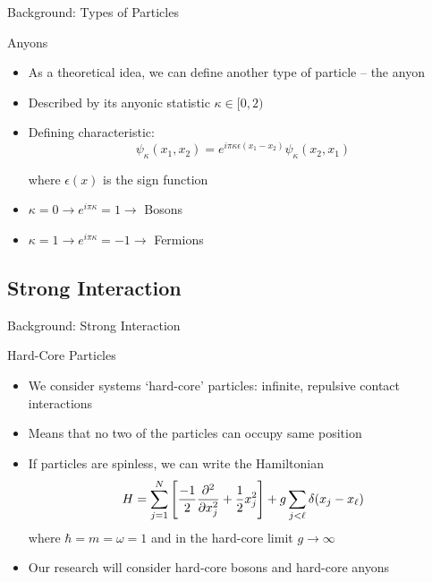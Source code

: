 \documentclass[12pt, usenames, dvipsnames]{beamer}
\begin{document}
\begin{frame}[t]{Background: Types of Particles}


\begin{block}{Anyons}

\begin{itemize}
\item As a theoretical idea, we can define another type of particle -- the anyon
\item Described by its anyonic statistic $\kappa \in [0,2)$ 
\item Defining characteristic:
\[ \psi_{\kappa}(x_{1}, x_{2}) = e^{i \pi \kappa \epsilon(x_1 - x_2)} \psi_{\kappa}(x_{2}, x_{1})  \]

where $\epsilon(x)$ is the sign function

\item $\kappa  = 0 \rightarrow e^{i \pi \kappa} = 1 \rightarrow$ Bosons
\item $\kappa  = 1 \rightarrow e^{i \pi \kappa} = -1 \rightarrow$ Fermions
\end{itemize}
\end{block}


\end{frame}

\subsection{Strong Interaction}


\begin{frame}[t]{Background: Strong Interaction}

\begin{block}{Hard-Core Particles}
\begin{itemize}
\item We consider systems `hard-core' particles: infinite, repulsive contact interactions
\item Means that no two of the particles can occupy same position
\item If particles are spinless, we can write the Hamiltonian
\[ H = \sum_{j = 1}^{N} \left[ \frac{-1}{2} \pdv[2]{}{x_{j}} + \frac{1}{2}x_j^2 \right]
	+ g \sum_{j < \ell} \delta(x_j - x_\ell) \]
where $\hbar = m = \omega = 1$ and in the hard-core limit $g \rightarrow \infty$

\item Our research will consider hard-core bosons and hard-core anyons
\end{itemize}


\end{block}


\end{frame}
\end{document}
